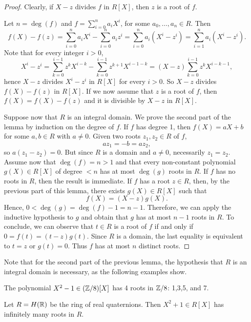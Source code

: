 \begin{proof}
Clearly, if $X-z$ divides $f$ in $R[X]$, then $z$ is a root of $f$.

Let $n=\deg(f)$ and $f=\sum_{i=0}^n a_iX^i$,
for some $a_0,\dots,a_n\in R$. Then
\[
f(X)-f(z)
=\sum_{i=0}^n a_iX^i-\sum_{i=0}^n a_iz^i
=\sum_{i=0}^n a_i(X^i-z^i)
=\sum_{i=1}^n a_i(X^i-z^i).
\]
Note that for every integer $i>0$,
\[
X^i-z^i
=\sum_{k=0}^{i-1}z^{k} X^{i-k}-\sum_{k=0}^{i-1}z^{k+1} X^{i-1-k}
=(X-z)\sum_{k=0}^{i-1}z^{k} X^{i-k-1},
\]
hence $X-z$ divides $X^i-z^i$ in $R[X]$ for every $i>0$.
So $X-z$ divides $f(X)-f(z)$ in $R[X]$.
If we now assume that $z$ is a root of $f$,
then $f(X)=f(X)-f(z)$ and it is divisible by $X-z$ in $R[X]$.

Suppose now that $R$ is an integral domain.
We prove the second part of the lemma by induction on the degree of $f$.
If $f$ has degree 1, then $f(X)=aX+b$ for some $a,b\in R$ with $a\neq 0$.
Given two roots $z_1,z_2\in R$  of $f$, 
\[
az_1=-b=az_2,
\]
so $a(z_1-z_2)=0$.
But since $R$ is a domain and $a\neq 0$,
necessarily $z_1=z_2$. Assume now that 
$\deg(f)=n>1$ and that every non-constant polynomial $g(X)\in R[X]$
of degree $<n$ has at most $\deg(g)$ roots in $R$.
If $f$ has no roots in $R$, then the result is immediate.
If $f$ has a root $z\in R$, then, by the previous part of this lemma,
there exists $g(X)\in R[X]$ such that 
\[
f(X)=(X-z)g(X).
\]
Hence, $0<\deg(g)=\deg(f)-1=n-1$.
Therefore, we can apply the inductive hypothesis to $g$
and obtain that $g$ has at most $n-1$ roots in $R$.
To conclude, we can observe that $t\in R$ is a root of $f$
if and only if $0=f(t)=(t-z)g(t)$.
Since $R$ is a domain, the last equality is equivalent to
$t=z$ or $g(t)=0$.
Thus $f$ has at most $n$ distinct roots.
\end{proof}

Note that for the second part of the previous lemma,
the hypothesis that $R$ is an integral domain is necessary,
as the following examples show.

\begin{example}
   The polynomial $X^2-1\in(\mathbb{Z}/8)[X]$ has 4 roots in $\mathbb{Z}/8$: 1,3,5, and 7.
\end{example}

\begin{example}
    Let $R=H(\mathbb{R})$ be the ring of real quaternions. Then 
    $X^2+1\in R[X]$ has infinitely many roots in $R$.    
\end{example}

